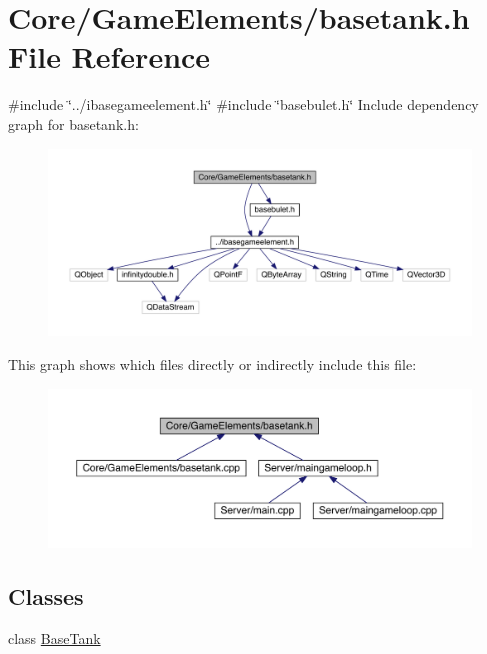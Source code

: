 \hypertarget{a00041}{}\section{Core/\+Game\+Elements/basetank.h File Reference}
\label{a00041}
{\ttfamily \#include \char`\"{}../ibasegameelement.\+h\char`\"{}}\newline
{\ttfamily \#include \char`\"{}basebulet.\+h\char`\"{}}\newline
Include dependency graph for basetank.\+h\+:
\nopagebreak
\begin{figure}[H]
\begin{center}
\leavevmode
\includegraphics[width=350pt]{d5/db6/a00042}
\end{center}
\end{figure}
This graph shows which files directly or indirectly include this file\+:
\nopagebreak
\begin{figure}[H]
\begin{center}
\leavevmode
\includegraphics[width=350pt]{d6/d42/a00043}
\end{center}
\end{figure}
\subsection*{Classes}
\begin{DoxyCompactItemize}
\item 
class \hyperlink{a00157}{Base\+Tank}
\end{DoxyCompactItemize}
